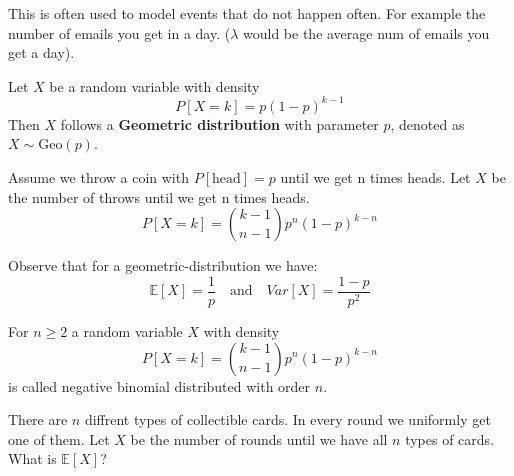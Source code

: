 \begin{remark}
    This is often used to model events that do not happen often. For example the number of emails you get in a day. ($\lambda$ would be the average num of emails you get a day).
\end{remark}

\begin{definition}
    Let $X$ be a random variable with density
    $$P[X=k] = p(1-p)^{k-1}$$
    Then $X$ follows a \textbf{Geometric distribution} with parameter $p$, denoted as $X \sim \text{Geo}(p)$.
\end{definition}

\begin{example}
    Assume we throw a coin with $P[\text{head}] = p$ until we get n times heads. Let $X$ be the number of throws until we get n times heads.
    $$P[X=k] = \binom{k-1}{n-1} p^n (1-p)^{k-n}$$
\end{example}

\begin{remark}
    Observe that for a geometric-distribution we have:
    $$\mathbb{E}[X] = \frac{1}{p} \quad \text{and} \quad Var[X] = \frac{1-p}{p^2}$$
\end{remark}

\begin{definition}
    For $n \geq 2$ a random variable $X$ with density
    $$P[X=k] = \binom{k-1}{n-1} p^n (1-p)^{k-n}$$
    is called negative binomial distributed with order $n$.
\end{definition}

\begin{example}
    There are $n$ diffrent types of collectible cards. In every round we uniformly get one of them. Let $X$ be the number of rounds until we have all $n$ types of cards. What is $\mathbb{E}[X]$?
\end{example}